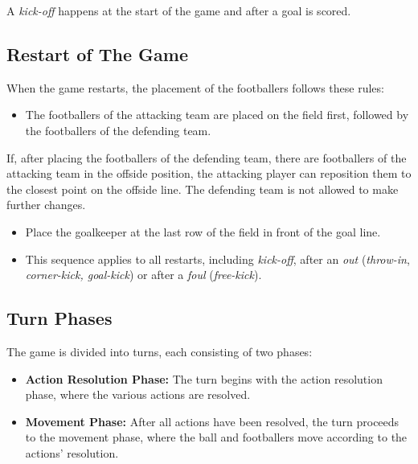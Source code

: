 \documentclass[12pt]{article}
\begin{document}
A \emph{kick-off }happens at the start of the game and after a goal is scored.

\subsection{\textbf{Restart of The Game}}

When the game restarts, the placement of the footballers follows these rules:

\begin{rulebox}
\begin{itemize}
\item The footballers of the attacking team are placed on the field first, followed by the footballers of the defending team.
\end{itemize}
\end{rulebox}

\begin{specialcase}
If, after placing the footballers of the defending team, there are footballers of the attacking team in the offside position, the attacking player can reposition them to the closest point on the offside line. The defending team is not allowed to make further changes.
\end{specialcase}

\begin{note}
\begin{itemize}
\item Place the goalkeeper at the last row of the field in front of the goal line.
\item This sequence applies to all restarts, including \emph{kick-off}, after an \emph{out }(\emph{throw-in}, \emph{corner-kick, goal-kick}) or after a \emph{foul} (\emph{free-kick}).
\end{itemize}
\end{note}

\subsection{\textbf{Turn Phases}}

The game is divided into turns, each consisting of two phases:

\begin{rulebox}
\begin{itemize}
\item \textbf{Action Resolution Phase: }The turn begins with the action resolution phase, where the various actions are resolved.
\item \textbf{Movement Phase: }After all actions have been resolved, the turn proceeds to the movement phase, where the ball and footballers move according to the actions' resolution.
\end{itemize}
\end{rulebox}
\end{document}
